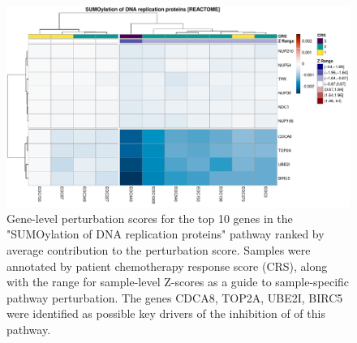 \documentclass[9pt,a4paper,]{extarticle}
\begin{document}
\begin{figure}

{\centering \includegraphics[width=1\linewidth]{sSNAPPY_paper_files/figure-latex/Figure7-1} 

}

\caption{Gene-level perturbation scores for the top 10 genes in the "SUMOylation of DNA replication proteins" pathway ranked by average contribution to the perturbation score. Samples were annotated by patient chemotherapy response score (CRS), along with the range for sample-level Z-scores as a guide to sample-specific pathway perturbation. The genes CDCA8, TOP2A, UBE2I, BIRC5 were identified as possible key drivers of the inhibition of of this pathway.}\label{fig:Figure7}
\end{figure}
\end{document}
